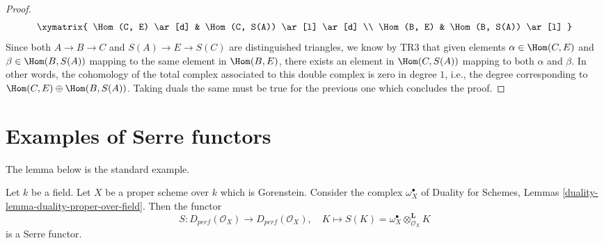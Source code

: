 \begin{proof}
$$
\xymatrix{
\Hom(C, E) \ar[d] &
\Hom(C, S(A)) \ar[l] \ar[d] \\
\Hom(B, E) &
\Hom(B, S(A)) \ar[l]
}
$$
Since both $A \to B \to C$ and $S(A) \to E \to S(C)$ are distinguished
triangles, we know by TR3 that given elements $\alpha \in \Hom(C, E)$
and $\beta \in \Hom(B, S(A))$ mapping to the same element in
$\Hom(B, E)$, there exists an element in $\Hom(C, S(A))$ mapping
to both $\alpha$ and $\beta$. In other words, the cohomology of
the total complex associated to this double complex is zero in degree
$1$, i.e., the degree corresponding to $\Hom(C, E) \oplus \Hom(B, S(A))$.
Taking duals the same must be true for the previous one which concludes
the proof.
\end{proof}






\section{Examples of Serre functors}
\label{section-examples-Serre-functors}

\noindent
The lemma below is the standard example.

\begin{lemma}
\label{lemma-Serre-functor-Gorenstein-proper}
Let $k$ be a field. Let $X$ be a proper scheme over $k$ which is Gorenstein.
Consider the complex $\omega_X^\bullet$ of
Duality for Schemes, Lemmas \ref{duality-lemma-duality-proper-over-field}.
Then the functor
$$
S : D_{perf}(\mathcal{O}_X) \longrightarrow D_{perf}(\mathcal{O}_X),\quad
K \longmapsto S(K) = \omega_X^\bullet \otimes_{\mathcal{O}_X}^\mathbf{L} K
$$
is a Serre functor.
\end{lemma}

